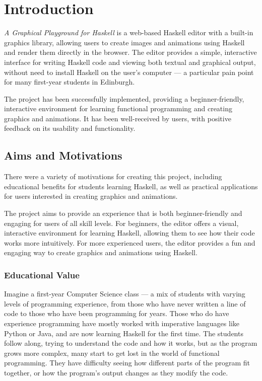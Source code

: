 \documentclass[../main.tex]{subfiles}
\begin{document}
\chapter{Introduction} \label{ch:introduction}
    \emph{A Graphical Playground for Haskell} is a web-based Haskell
    editor with a built-in graphics library, allowing users to create images and
    animations using Haskell and render them directly in the browser.
    The editor provides a simple, interactive interface for writing Haskell code
        and viewing both textual and graphical output, without need to install Haskell
        on the user's computer — a particular pain point for many first-year students
        in Edinburgh.

    The project has been successfully implemented, providing a beginner-friendly,
        interactive environment for learning functional programming and creating
        graphics and animations.
    It has been well-received by users, with positive feedback on its usability and
        functionality.

    \section{Aims and Motivations}
        There were a variety of motivations for creating this project, including
            educational benefits for students learning Haskell, as well as practical
            applications for users interested in creating graphics and animations.

        The project aims to provide an experience that is both beginner-friendly and
            engaging for users of all skill levels.
        For beginners, the editor offers a visual, interactive environment for learning
            Haskell, allowing them to see how their code works more intuitively.
        For more experienced users, the editor provides a fun and engaging way to
            create graphics and animations using Haskell.

        \subsection{Educational Value}
            Imagine a first-year Computer Science class — a mix of students with varying
                levels of programming experience, from those who have never written a line of
                code to those who have been programming for years.
            Those who do have experience programming have mostly worked with imperative
                languages like Python or Java, and are now learning Haskell for the first time.
            The students follow along, trying to understand the code and how it works, but
                as the program grows more complex, many start to get lost in the world of
                functional programming.
            They have difficulty seeing how different parts of the program fit together, or
                how the program's output changes as they modify the code.
\end{document}
